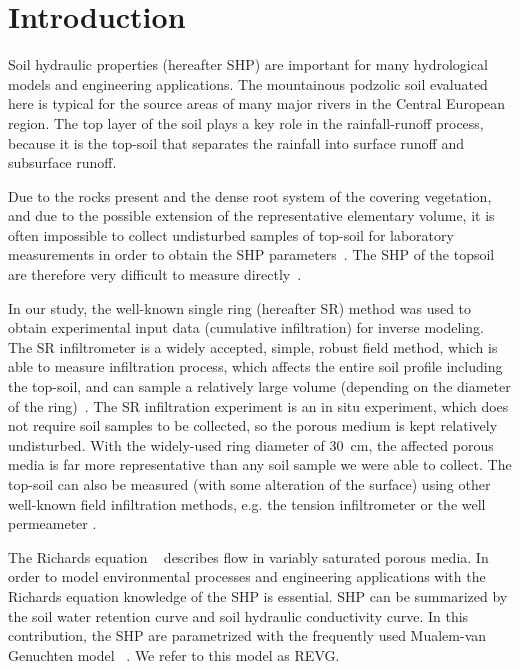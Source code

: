 \documentclass[review]{elsarticle}
\begin{document}
\linenumbers

\section{Introduction}%

Soil hydraulic properties (hereafter SHP) are important for many hydrological models and engineering applications. The mountainous podzolic soil evaluated here is typical for the source areas of many major rivers in the Central European region. The top layer of the soil plays a key role in the rainfall-runoff process, because it is the top-soil that separates the rainfall into surface runoff and subsurface runoff. 


Due to the rocks present and the dense root system of the covering vegetation, and due to the possible extension of the representative elementary volume, it is often impossible to collect undisturbed samples of top-soil for laboratory measurements in order to obtain the SHP parameters~\citep{Jacka1}. The SHP of the topsoil are therefore very difficult to measure directly~\citep{Fodor, Jacka1}. 


In our study, the well-known single ring (hereafter SR) method was used to obtain experimental input data (cumulative infiltration) for inverse modeling. The SR infiltrometer is a widely accepted, simple, robust field method, which is able to measure infiltration process, which affects the entire soil profile including the top-soil,  and can sample a relatively large volume (depending on the diameter of the ring)~\citep{Cheng,ReynoldsWD}.  The SR infiltration experiment is an in situ experiment, which does not require soil samples to be collected, so the porous medium is kept relatively undisturbed. With the widely-used ring diameter of 30~cm, the affected porous media is far more representative than any soil sample  we were able to collect. The top-soil can also be measured (with some alteration of the surface) using other well-known field infiltration methods, e.g. the tension infiltrometer or the well permeameter  \citep{AnguloJaramillo,ReynoldsWDGP}. 

The Richards equation ~\citep{richards} describes flow in variably saturated porous media. In order to model environmental processes and engineering applications with the Richards equation knowledge of the SHP is essential. SHP can be summarized by the soil water retention curve and soil hydraulic conductivity curve. In this contribution, the SHP are parametrized with the frequently used Mualem-van Genuchten model ~\citep{vangenuchten}. We refer to this model as REVG.
\end{document}
